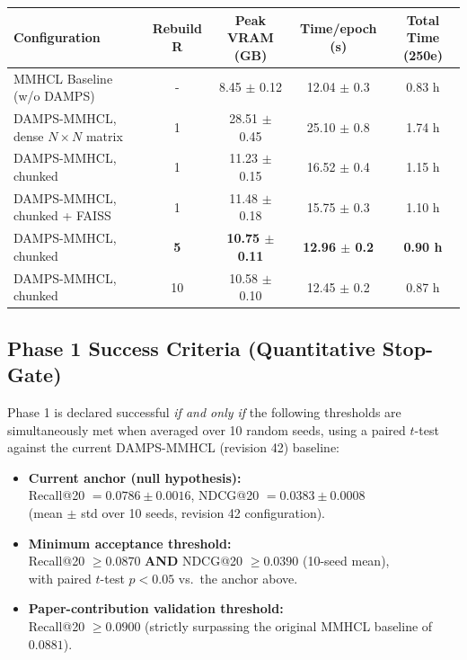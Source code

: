 \documentclass[12pt, a4paper]{article}
\begin{document}
\begin{table}[htbp]
\centering
\renewcommand{\arraystretch}{1.2}
\begin{tabular}{|l|c|c|c|c|}
\hline
\textbf{Configuration} & \textbf{Rebuild R} & \textbf{Peak VRAM (GB)} & \textbf{Time/epoch (s)} & \textbf{Total Time (250e)} \\
\hline
MMHCL Baseline (w/o DAMPS) & - & 8.45 $\pm$ 0.12 & 12.04 $\pm$ 0.3 & 0.83 h \\
\hline
DAMPS-MMHCL, dense $N \times N$ matrix & 1 & 28.51 $\pm$ 0.45 & 25.10 $\pm$ 0.8 & 1.74 h \\
\hline
DAMPS-MMHCL, chunked & 1 & 11.23 $\pm$ 0.15 & 16.52 $\pm$ 0.4 & 1.15 h \\
\hline
DAMPS-MMHCL, chunked + FAISS & 1 & 11.48 $\pm$ 0.18 & 15.75 $\pm$ 0.3 & 1.10 h \\
\hline
DAMPS-MMHCL, chunked & \textbf{5} & \textbf{10.75 $\pm$ 0.11} & \textbf{12.96 $\pm$ 0.2} & \textbf{0.90 h} \\
\hline
DAMPS-MMHCL, chunked & 10 & 10.58 $\pm$ 0.10 & 12.45 $\pm$ 0.2 & 0.87 h \\
\hline
\end{tabular}
\end{table}

\subsection{Phase 1 Success Criteria (Quantitative Stop-Gate)}
Phase 1 is declared successful \emph{if and only if} the following thresholds are simultaneously met when averaged over 10 random seeds, using a paired $t$-test against the current DAMPS-MMHCL (revision 42) baseline:

\begin{mdframed}[backgroundcolor=backcolour, linecolor=codegray, linewidth=0.5pt]
\begin{itemize}[leftmargin=*]
    \item \textbf{Current anchor (null hypothesis):} \\
    Recall@20 $= 0.0786 \pm 0.0016$, \quad NDCG@20 $= 0.0383 \pm 0.0008$ \\
    (mean $\pm$ std over 10 seeds, revision 42 configuration).
    \item \textbf{Minimum acceptance threshold:} \\
    Recall@20 $\geq 0.0870$ \textbf{AND} NDCG@20 $\geq 0.0390$ (10-seed mean), \\
    with paired $t$-test $p < 0.05$ vs.\ the anchor above.
    \item \textbf{Paper-contribution validation threshold:} \\
    Recall@20 $\geq 0.0900$ (strictly surpassing the original MMHCL baseline of $0.0881$).
\end{itemize}
\end{mdframed}
\end{document}
